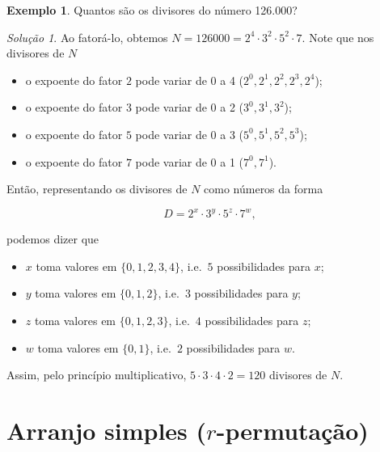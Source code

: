 \documentclass[]{book}
\providecommand{\tightlist}{%
  \setlength{\itemsep}{0pt}\setlength{\parskip}{0pt}}
\theoremstyle{definition}
\theoremstyle{definition}
\newtheorem{example}{Exemplo}[chapter]
\theoremstyle{definition}
\theoremstyle{remark}
\newtheorem*{solution}{Solução}
\begin{document}
\begin{example}
\protect\hypertarget{exm:unnamed-chunk-36}{}{\label{exm:unnamed-chunk-36} }Quantos são os divisores do número 126.000?
\end{example}

\begin{solution}
\iffalse{} {Solução. } \fi{}Ao fatorá-lo, obtemos \(N=126000=2^4\cdot 3^2\cdot 5^2\cdot 7\).
Note que nos divisores de \(N\)

\begin{itemize}
\tightlist
\item
  o expoente do fator \(2\) pode variar de 0 a 4 (\(2^0, 2^1, 2^2, 2^3, 2^4\));
\item
  o expoente do fator \(3\) pode variar de 0 a 2 (\(3^0, 3^1, 3^2\));
\item
  o expoente do fator \(5\) pode variar de 0 a 3 (\(5^0, 5^1, 5^2, 5^3\));
\item
  o expoente do fator \(7\) pode variar de 0 a 1 (\(7^0, 7^1\)).
\end{itemize}

Então, representando os divisores de \(N\) como números da forma

\[D = 2^x\cdot 3^y\cdot 5^z\cdot 7^w,\]

podemos dizer que

\begin{itemize}
\tightlist
\item
  \(x\) toma valores em \(\{0,1,2,3,4\}\), i.e.~\(5\) possibilidades para \(x\);
\item
  \(y\) toma valores em \(\{0,1,2\}\), i.e.~\(3\) possibilidades para \(y\);
\item
  \(z\) toma valores em \(\{0,1,2,3\}\), i.e.~\(4\) possibilidades para \(z\);
\item
  \(w\) toma valores em \(\{0,1\}\), i.e.~\(2\) possibilidades para \(w\).
\end{itemize}

Assim, pelo princípio multiplicativo, \(5\cdot 3\cdot 4\cdot 2 = 120\) divisores de \(N\).
\end{solution}

\hypertarget{arranjo-simples-r-permutauxe7uxe3o}{%
\section{\texorpdfstring{Arranjo simples (\(r\)-permutação)}{Arranjo simples (r-permutação)}}\label{arranjo-simples-r-permutauxe7uxe3o}}
\end{document}
